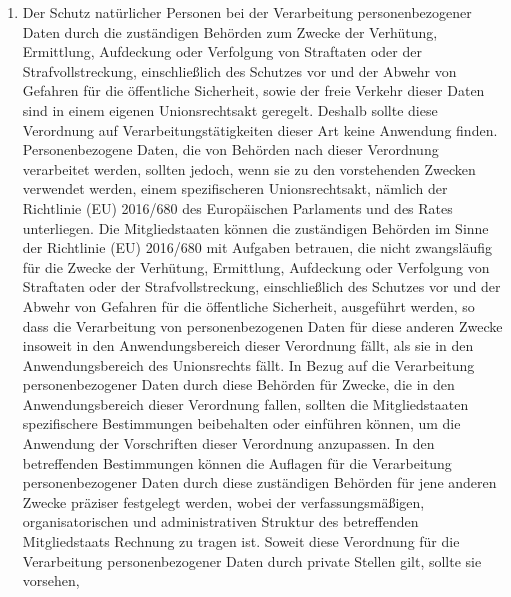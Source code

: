 \begin{enumerate}
   \item Der Schutz natürlicher Personen bei der Verarbeitung personenbezogener Daten durch die zuständigen Behörden zum
    Zwecke der Verhütung, Ermittlung, Aufdeckung oder Verfolgung von Straftaten oder der Strafvollstreckung,
    einschließlich des Schutzes vor und der Abwehr von Gefahren für die öffentliche Sicherheit, sowie der freie Verkehr
    dieser Daten sind in einem eigenen Unionsrechtsakt geregelt. Deshalb sollte diese Verordnung auf
    Verarbeitungstätigkeiten dieser Art keine Anwendung finden. Personenbezogene Daten, die von Behörden nach dieser
    Verordnung verarbeitet werden, sollten jedoch, wenn sie zu den vorstehenden Zwecken verwendet werden, einem
    spezifischeren Unionsrechtsakt, nämlich der Richtlinie (EU) 2016/680 des Europäischen Parlaments und des
    Rates unterliegen. Die Mitgliedstaaten können die zuständigen Behörden im Sinne der
     Richtlinie (EU) 2016/680 mit Aufgaben betrauen, die nicht zwangsläufig für die Zwecke der Verhütung, Ermittlung,
     Aufdeckung oder Verfolgung von Straftaten oder der Strafvollstreckung, einschließlich des Schutzes vor und der
     Abwehr von Gefahren für die öffentliche Sicherheit, ausgeführt werden, so dass die Verarbeitung von
     personenbezogenen Daten für diese anderen Zwecke insoweit in den Anwendungsbereich dieser Verordnung fällt, als
     sie in den Anwendungsbereich des Unionsrechts fällt. In Bezug auf die Verarbeitung personenbezogener Daten durch
     diese Behörden für Zwecke, die in den Anwendungsbereich dieser Verordnung fallen, sollten die Mitgliedstaaten
     spezifischere Bestimmungen beibehalten oder einführen können, um die Anwendung der Vorschriften dieser Verordnung
     anzupassen. In den betreffenden Bestimmungen können die Auflagen für die Verarbeitung personenbezogener Daten
     durch diese zuständigen Behörden für jene anderen Zwecke präziser festgelegt werden, wobei der verfassungsmäßigen,
     organisatorischen und administrativen Struktur des betreffenden Mitgliedstaats Rechnung zu tragen ist. Soweit
     diese Verordnung für die Verarbeitung personenbezogener Daten durch private Stellen gilt, sollte sie vorsehen,

\end{enumerate}
